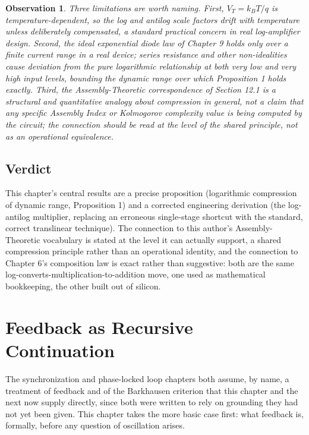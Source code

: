 \documentclass[12pt]{article}
\newtheorem{observation}{Observation}
\begin{document}
\begin{observation}
Three limitations are worth naming. First, $V_T = k_BT/q$ is temperature-dependent, so the log and antilog scale factors drift with temperature unless deliberately compensated, a standard practical concern in real log-amplifier design. Second, the ideal exponential diode law of Chapter 9 holds only over a finite current range in a real device; series resistance and other non-idealities cause deviation from the pure logarithmic relationship at both very low and very high input levels, bounding the dynamic range over which Proposition 1 holds exactly. Third, the Assembly-Theoretic correspondence of Section 12.1 is a structural and quantitative analogy about compression in general, not a claim that any specific Assembly Index or Kolmogorov complexity value is being computed by the circuit; the connection should be read at the level of the shared principle, not as an operational equivalence.
\end{observation}

\subsection{Verdict}

This chapter's central results are a precise proposition (logarithmic compression of dynamic range, Proposition 1) and a corrected engineering derivation (the log-antilog multiplier, replacing an erroneous single-stage shortcut with the standard, correct translinear technique). The connection to this author's Assembly-Theoretic vocabulary is stated at the level it can actually support, a shared compression principle rather than an operational identity, and the connection to Chapter 6's composition law is exact rather than suggestive: both are the same log-converts-multiplication-to-addition move, one used as mathematical bookkeeping, the other built out of silicon.

\section{Feedback as Recursive Continuation}

The synchronization and phase-locked loop chapters both assume, by name, a treatment of feedback and of the Barkhausen criterion that this chapter and the next now supply directly, since both were written to rely on grounding they had not yet been given. This chapter takes the more basic case first: what feedback is, formally, before any question of oscillation arises.
\end{document}
